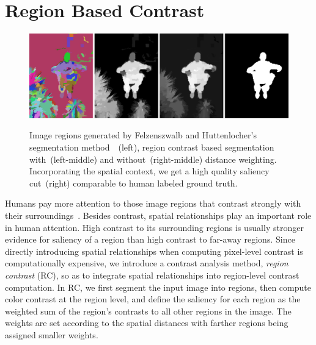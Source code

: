 \documentclass[final]{cvpr}
\newcommand{\vnudge}{\vspace*{-.1in}}
\begin{document}
\section{Region Based Contrast}

\begin{figure}
    \centering
    \includegraphics[width=\columnwidth]{region_contrast.pdf}\\
    \caption{Image regions generated by Felzenszwalb and Huttenlocher's
      segmentation method~\cite{04ijcv/felzenszwalb_efficient}~(left),
      region contrast based segmentation with~(left-middle) and without~(right-middle) distance weighting.
      Incorporating the spatial context, we get a high quality saliency cut~(right) comparable to
      human labeled ground truth.
    }\label{fig:regContrast} \vnudge
\end{figure}


Humans pay more attention to those image regions that contrast strongly with their
surroundings~\cite{03neuroscience/luminanceContrast}.
%
Besides contrast, spatial relationships play an  important role in human attention.
%
High contrast to its surrounding regions is usually stronger evidence for
saliency of a region than high contrast to far-away regions.
%
Since directly introducing spatial relationships when computing pixel-level contrast is
computationally expensive, we introduce a   contrast analysis method, \emph{region contrast} (RC),
so as to integrate spatial relationships into region-level contrast computation.
%
In RC, we first segment the input image into regions, then compute color contrast at the region level,
and define the saliency for each region as the weighted sum of the region's contrasts
to all other regions in the image.
%
The weights are set according to the spatial distances with farther regions being assigned smaller
weights.


\end{document}
